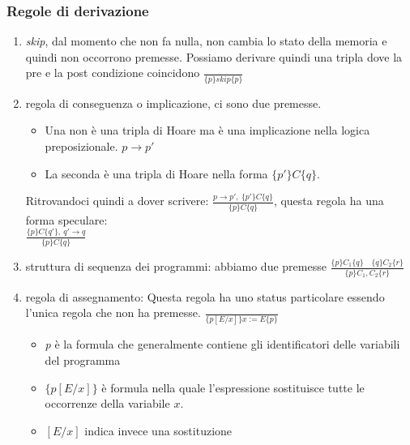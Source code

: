 \subsubsection{Regole di derivazione}
\begin{enumerate}
    \item \textit{skip}, dal momento che non fa nulla, non cambia lo stato della memoria e quindi non occorrono premesse. Possiamo derivare quindi una tripla dove la pre e la post condizione coincidono
    $\displaystyle \frac{}{\{p\}skip\{p\}}$
    \item regola di conseguenza o implicazione, ci sono due premesse. 
    \begin{itemize}
        \item Una non è una tripla di Hoare ma è una implicazione nella logica preposizionale.
        $p \to p'$
        \item La seconda è una tripla di Hoare nella forma $\{p'\}C\{q\}$. 
    \end{itemize} 
    Ritrovandoci quindi a dover scrivere: $\displaystyle \frac{p \to p' ,\ \{p'\}C\{q\}}{\{p\} C \{q\}}$, questa regola ha una forma speculare: \\ $\displaystyle \frac{\{p\}C\{q'\} ,\ q' \to q }{\{p\} C \{q\}}$
    \item struttura di sequenza dei programmi: abbiamo due premesse $\displaystyle \frac{\{p\}C_1\{q\} \quad \{q\}C_2\{r\}}{\{p\}C_1,C_2\{r\}}$
    \item regola di assegnamento: Questa regola ha uno status particolare essendo l'unica regola che non ha premesse. 
    $\displaystyle \frac{}{\{p[E/x]\}x := E\{p\}}$ 
    \begin{itemize}
        \item \textit{p} è la formula che generalmente contiene gli identificatori delle variabili del programma
        \item \textit{$\{p[E/x]\}$} è formula nella quale l’espressione sostituisce tutte le occorrenze della variabile $x$.
        \item \textit{$[E/x]$} indica invece una sostituzione
    \end{itemize}
\end{enumerate}